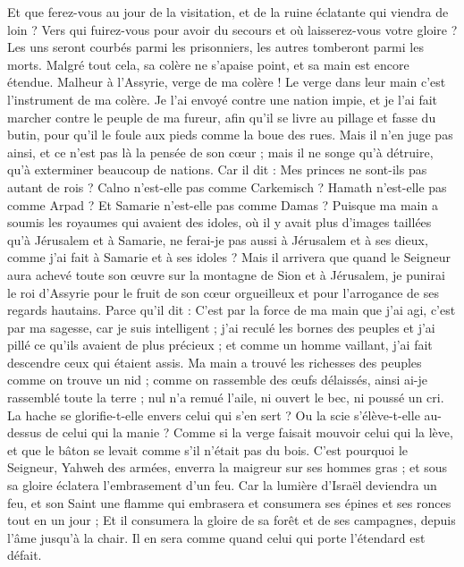 \begin{multicols}{2}
Et que ferez-vous au jour de la visitation, et de la ruine éclatante qui viendra de loin ? Vers qui fuirez-vous pour avoir du secours et où laisserez-vous votre gloire ?
Les uns seront courbés parmi les prisonniers, les autres tomberont parmi les morts. Malgré tout cela, sa colère ne s'apaise point, et sa main est encore étendue.
Malheur à l'Assyrie, verge de ma colère ! Le verge dans leur main c'est l'instrument de ma colère.
Je l'ai envoyé contre une nation impie, et je l'ai fait marcher contre le peuple de ma fureur, afin qu'il se livre au pillage et fasse du butin, pour qu'il le foule aux pieds comme la boue des rues.
Mais il n'en juge pas ainsi, et ce n'est pas là la pensée de son cœur ; mais il ne songe qu'à détruire, qu'à exterminer beaucoup de nations.
Car il dit : Mes princes ne sont-ils pas autant de rois ?
Calno n'est-elle pas comme Carkemisch ? Hamath n'est-elle pas comme Arpad ? Et Samarie n'est-elle pas comme Damas ?
Puisque ma main a soumis les royaumes qui avaient des idoles, où il y avait plus d'images taillées qu'à Jérusalem et à Samarie,
ne ferai-je pas aussi à Jérusalem et à ses dieux, comme j'ai fait à Samarie et à ses idoles ?
Mais il arrivera que quand le Seigneur aura achevé toute son œuvre sur la montagne de Sion et à Jérusalem, je punirai le roi d'Assyrie pour le fruit de son cœur orgueilleux et pour l'arrogance de ses regards hautains.
Parce qu'il dit : C'est par la force de ma main que j'ai agi, c'est par ma sagesse, car je suis intelligent ; j'ai reculé les bornes des peuples et j'ai pillé ce qu'ils avaient de plus précieux ; et comme un homme vaillant, j'ai fait descendre ceux qui étaient assis.
Ma main a trouvé les richesses des peuples comme on trouve un nid ; comme on rassemble des œufs délaissés, ainsi ai-je rassemblé toute la terre ; nul n'a remué l'aile, ni ouvert le bec, ni poussé un cri.
La hache se glorifie-t-elle envers celui qui s'en sert ? Ou la scie s'élève-t-elle au-dessus de celui qui la manie ? Comme si la verge faisait mouvoir celui qui la lève, et que le bâton se levait comme s'il n'était pas du bois.
C'est pourquoi le Seigneur, Yahweh des armées, enverra la maigreur sur ses hommes gras ; et sous sa gloire éclatera l'embrasement d'un feu.
Car la lumière d'Israël deviendra un feu, et son Saint une flamme qui embrasera et consumera ses épines et ses ronces tout en un jour ;
Et il consumera la gloire de sa forêt et de ses campagnes, depuis l'âme jusqu'à la chair. Il en sera comme quand celui qui porte l'étendard est défait.

\end{multicols}
